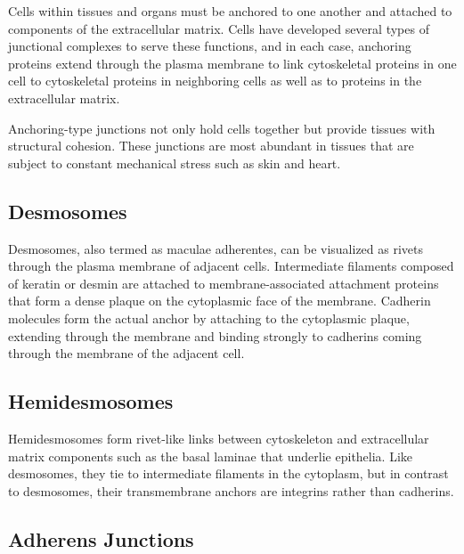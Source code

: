 Cells within tissues and organs must be anchored to one another and attached to components of the extracellular matrix. Cells have developed several types of junctional complexes to serve these functions, and in each case, anchoring proteins extend through the plasma membrane to link cytoskeletal proteins in one cell to cytoskeletal proteins in neighboring cells as well as to proteins in the extracellular matrix.

Anchoring-type junctions not only hold cells together but provide tissues with structural cohesion. These junctions are most abundant in tissues that are subject to constant mechanical stress such as skin and heart.

\hypertarget{desmosomes}{%
\subsection{Desmosomes}\label{desmosomes}}

Desmosomes, also termed as maculae adherentes, can be visualized as rivets through the plasma membrane of adjacent cells. Intermediate filaments composed of keratin or desmin are attached to membrane-associated attachment proteins that form a dense plaque on the cytoplasmic face of the membrane. Cadherin molecules form the actual anchor by attaching to the cytoplasmic plaque, extending through the membrane and binding strongly to cadherins coming through the membrane of the adjacent cell.

\hypertarget{hemidesmosomes}{%
\subsection{Hemidesmosomes}\label{hemidesmosomes}}

Hemidesmosomes form rivet-like links between cytoskeleton and extracellular matrix components such as the basal laminae that underlie epithelia. Like desmosomes, they tie to intermediate filaments in the cytoplasm, but in contrast to desmosomes, their transmembrane anchors are integrins rather than cadherins.

\hypertarget{adherens-junctions}{%
\subsection{Adherens Junctions}\label{adherens-junctions}}

